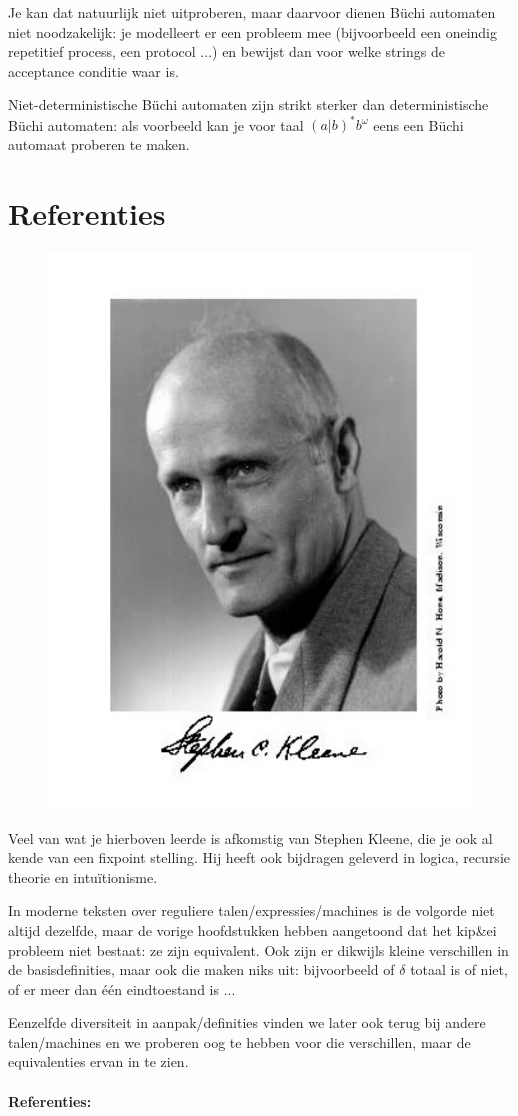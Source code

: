 Je kan dat natuurlijk niet uitproberen, maar daarvoor dienen B\"{u}chi
automaten niet noodzakelijk: je modelleert er een probleem mee
(bijvoorbeeld een oneindig repetitief process, een protocol ...) en
bewijst dan voor welke strings de acceptance conditie waar is.  

Niet-deterministische B\"{u}chi automaten zijn strikt sterker dan
deterministische B\"{u}chi automaten: als voorbeeld kan je voor
taal $(a|b)^*b^\omega$ eens een B\"{u}chi automaat proberen te maken.



\clearpage
\section{Referenties}

\setlength{\intextsep}{0pt}
\begin{figure}
\includegraphics[width=.19\textwidth,keepaspectratio]{afbeeldingen/kleene}
\end{figure}

Veel van wat je hierboven leerde is afkomstig van Stephen Kleene,
die je ook al kende van een fixpoint stelling. Hij heeft ook bijdragen
geleverd in logica, recursie theorie en intu\"{i}tionisme.


In moderne teksten over reguliere talen/expressies/machines is de
volgorde niet altijd dezelfde, maar de vorige hoofdstukken hebben
aangetoond dat het kip\&ei probleem niet bestaat: ze zijn equivalent.
Ook zijn er dikwijls kleine verschillen in de basisdefinities, maar
ook die maken niks uit: bijvoorbeeld of $\delta$ totaal is of niet, of
er meer dan \'{e}\'{e}n eindtoestand is ... 


Eenzelfde diversiteit in aanpak/definities vinden we later ook terug
bij andere talen/machines en we proberen oog te hebben voor die
verschillen, maar de equivalenties ervan in te zien.




\paragraph{Referenties:}

